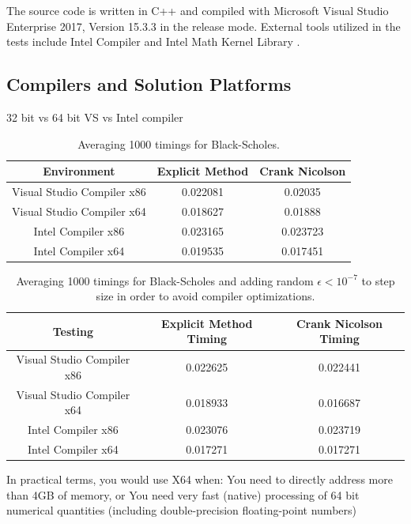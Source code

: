 \documentclass[12pt, oneside]{book}
\theoremstyle{plain}
\theoremstyle{definition}
\begin{document}
The source code is written in C++ and compiled with Microsoft Visual Studio Enterprise 2017, Version 15.3.3 in the release mode. External tools  utilized  in  the  tests  include   Intel Compiler and Intel Math  Kernel  Library .  

\subsection{Compilers and Solution Platforms}
32 bit vs 64 bit 
VS vs Intel compiler
\begin{table}[h!]
\centering
 \begin{tabular}{||c c c||} 
 \hline
 Environment & Explicit Method & Crank Nicolson\\ [0.5ex] 
 \hline\hline\hline
 Visual Studio Compiler x86 & 0.022081 & 0.02035\\ 
 Visual Studio Compiler x64 & 0.018627 & 0.01888\\
 Intel Compiler x86 & 0.023165 & 0.023723\\
 Intel Compiler x64 & 0.019535 & 0.017451\\ [1ex] 
 \hline
 \end{tabular}
 \caption{Averaging 1000 timings for Black-Scholes.}
\end{table}

\begin{table}[htp!]
\centering
 \begin{tabular}{||c c c||} 
 \hline
 Testing & Explicit Method Timing & Crank Nicolson Timing\\ [0.5ex] 
 \hline\hline\hline
 Visual Studio Compiler x86 & 0.022625 & 0.022441\\ 
 Visual Studio Compiler x64 & 0.018933 & 0.016687
\\
 Intel Compiler x86 & 0.023076 & 0.023719\\
 Intel Compiler x64 & 0.017271 & 0.017271\\[1ex] 
 \hline
 \end{tabular}
 \caption{Averaging 1000 timings for Black-Scholes and adding random $\epsilon < 10^{-7} $ to step size in order to avoid compiler optimizations.}
\end{table}



In practical terms, you would use X64 when:  You need to directly address more than 4GB of memory, or
    You need very fast (native) processing of 64 bit numerical quantities (including double-precision floating-point numbers)
\end{document}
